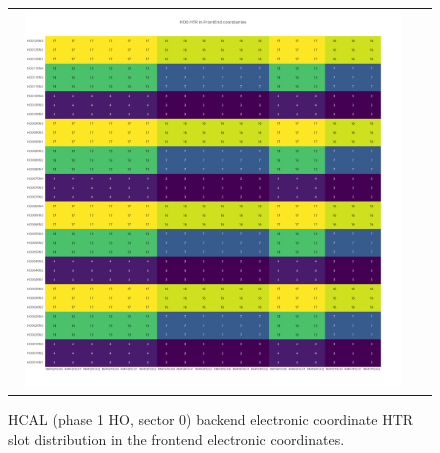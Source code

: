\begin{figure}[htb]
 \begin{center}
  \begin{tabular}{cc}
   \includegraphics[angle=0,width=0.95\textwidth]{figures/appendix/HO0_HTR_in_FrontEnd.png}
  \end{tabular}
  \caption{HCAL (phase 1 HO, sector 0) backend electronic coordinate HTR slot distribution in the frontend electronic coordinates.}
  \label{fig:lmapHO0HTRFEC}
 \end{center}
\end{figure}
\clearpage

